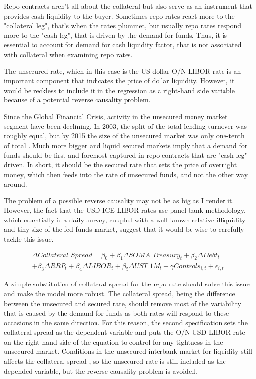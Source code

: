 \documentclass[11pt,a4paper,english,oneside]{article}
\begin{document}
Repo contracts aren't all about the collateral but also serve as an instrument that provides cash liquidity to the buyer. Sometimes repo rates react more to the "collateral leg", that's when the rates plummet, but usually repo rates respond more to the "cash leg", that is driven by the demand for funds. Thus, it is essential to account for demand for cash liquidity factor, that is not associated with collateral when examining repo rates.

The unsecured rate, which in this case is the US dollar O/N LIBOR rate is an important component that indicates the price of dollar liquidity. However, it would be reckless to include it in the regression as a right-hand side variable because of a potential reverse causality problem.

Since the Global Financial Crisis, activity in the unsecured money market segment have been declining. In 2003, the split of the total lending turnover was roughly equal, but by 2015 the size of the unsecured market was only one-tenth of total \citet{fiore2018}. Much more bigger and liquid secured markets imply that a demand for funds should be first and foremost captured in repo contracts that are "cash-leg" driven. In short, it should be the secured rate that sets the price of overnight money, which then feeds into the rate of unsecured funds, and not the other way around.

The problem of a possible reverse causality may not be as big as I render it. However, the fact that the USD ICE LIBOR rates use panel bank methodology, which essentially is a daily survey, coupled with a well-known relative illiquidity and tiny size of the fed funds market, suggest that it would be wise to carefully tackle this issue.

\begin{equation} \label{eq:2}
  \begin{gathered}
    \Delta \textit{Collateral Spread} = \beta_0 + \beta_1 \Delta \textit{SOMA Treasury}_t + \beta_2 \Delta \textit{Debt}_t \\ + \beta_3 \Delta \textit{RRP}_t + \beta_4 \Delta \textit{LIBOR}_t + \beta_5 \Delta \textit{UST 1M}_t + \gamma \textit{Controls}_{i,t} + \epsilon_{i,t}
  \end{gathered}
\end{equation}

A simple substitution of collateral spread for the repo rate should solve this issue and make the model more robust. The collateral spread, being the difference between the unsecured and secured rate, should remove most of the variability that is caused by the demand for funds as both rates will respond to these occasions in the same direction. For this reason, the second specification sets the collateral spread as the dependent variable and puts the O/N USD LIBOR rate on the right-hand side of the equation to control for any tightness in the unsecured market. Conditions in the unsecured interbank market for liquidity still affects the collateral spread \citet{nyborg2019a}, so the unsecured rate is still included as the depended variable, but the reverse causality problem is avoided.
\end{document}
